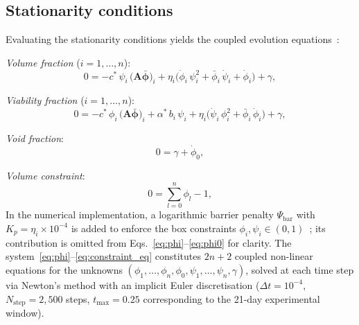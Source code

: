 \documentclass[pdflatex,sn-mathphys-ay,lineno]{sn-jnl}%
\newcommand{\bphi}{\boldsymbol{\phi}}
\begin{document}
\subsection{Stationarity conditions}


Evaluating the stationarity conditions yields the coupled evolution equations~\citep{Klempt2025ContinuumBiofilm}:

\medskip\noindent
\textit{Volume fraction} ($i=1,\dots,n$):
\begin{equation}
0 = -c^*\,\psi_i\,\bigl(\mathbf{A}\bar{\bphi}\bigr)_i
    + \eta_i\bigl(\dot\phi_i\,\psi_i^2 + \bar\phi_i\,\dot\psi_i + \dot\phi_i\bigr)
    + \gamma,
\label{eq:phi}
\end{equation}

\noindent\textit{Viability fraction} ($i=1,\dots,n$):
\begin{equation}
0 = -c^*\,\phi_i\,\bigl(\mathbf{A}\bar{\bphi}\bigr)_i
    + \alpha^*\,b_i\,\psi_i
    + \eta_i\bigl(\dot\psi_i\,\phi_i^2 + \bar\phi_i\,\dot\phi_i\bigr)
    + \gamma,
\label{eq:psi_evol}
\end{equation}

\noindent\textit{Void fraction}:
\begin{equation}
0 = \gamma + \dot\phi_0,
\label{eq:phi0}
\end{equation}

\noindent\textit{Volume constraint}:
\begin{equation}
0 = \sum_{l=0}^{n}\phi_l - 1,
\label{eq:constraint_eq}
\end{equation}
In the numerical implementation, a logarithmic barrier penalty $\Psi_{\mathrm{bar}}$ with $K_p=\eta_i\times10^{-4}$ is added to enforce the box constraints $\phi_i,\psi_i\in(0,1)$~\citep{Klempt2025ContinuumBiofilm}; its contribution is omitted from Eqs.~\eqref{eq:phi}--\eqref{eq:phi0} for clarity.
The system~\eqref{eq:phi}--\eqref{eq:constraint_eq} constitutes $2n+2$ coupled non-linear equations for the unknowns $(\phi_1,\dots,\phi_n,\phi_0,\psi_1,\dots,\psi_n,\gamma)$, solved at each time step via Newton's method with an implicit Euler discretisation ($\Delta t = 10^{-4}$, $N_{\mathrm{step}}=2{,}500$ steps, $t_{\max}=0.25$ corresponding to the 21-day experimental window).
\end{document}

